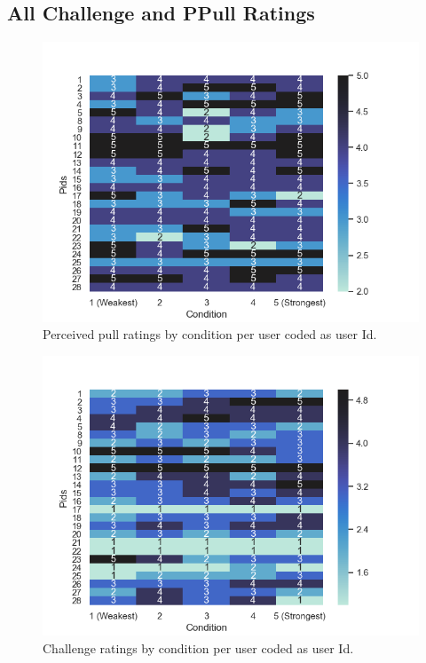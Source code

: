 \subsection{All Challenge and PPull Ratings}
\label{subsection:heatmap}
\begin{figure}[H]
\centering
\includegraphics[scale=0.7]{Files/Plots/ppull_by_condition_heatmap.png}
\caption{Perceived pull ratings by condition per user coded as user Id.}
\label{fig:ppullHeatmap}
\end{figure}

\vspace{-10mm}
\begin{figure}[H]
 \centering
\includegraphics[scale=0.7]{Files/Plots/challenge_by_condition_heatmap.png}
\caption{Challenge ratings by condition per user coded as user Id.}
\label{fig:challengeHeatmap}
\end{figure}

